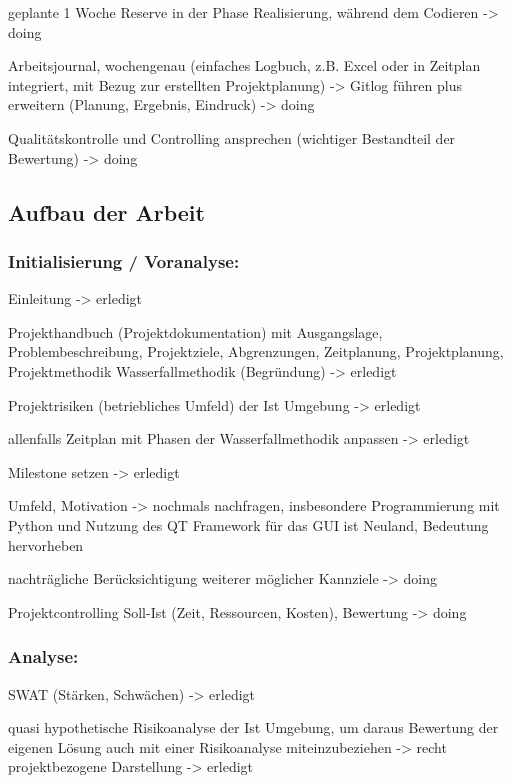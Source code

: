 \documentclass[a4paper,11pt]{article}
\begin{document}
geplante 1 Woche Reserve in der Phase Realisierung, während dem Codieren ->
doing

Arbeitsjournal, wochengenau (einfaches Logbuch, z.B. Excel oder in Zeitplan
integriert, mit Bezug zur erstellten Projektplanung) -> Gitlog führen plus
erweitern (Planung, Ergebnis, Eindruck) -> doing

Qualitätskontrolle und Controlling ansprechen (wichtiger Bestandteil der
Bewertung) -> doing

\subsection*{Aufbau der Arbeit}
\label{sec:org9c6b87a}

\subsubsection*{Initialisierung / Voranalyse:}
\label{sec:org50b579a}

Einleitung -> erledigt

Projekthandbuch (Projektdokumentation) mit Ausgangslage,
Problembeschreibung, Projektziele, Abgrenzungen, Zeitplanung,
Projektplanung, Projektmethodik Wasserfallmethodik (Begründung) -> erledigt

Projektrisiken (betriebliches Umfeld) der Ist Umgebung -> erledigt

allenfalls Zeitplan mit Phasen der Wasserfallmethodik anpassen -> erledigt

Milestone setzen -> erledigt

Umfeld, Motivation -> nochmals nachfragen, insbesondere Programmierung mit
Python und Nutzung des QT Framework für das GUI ist Neuland, Bedeutung
hervorheben

nachträgliche Berücksichtigung weiterer möglicher Kannziele -> doing

Projektcontrolling Soll-Ist (Zeit, Ressourcen, Kosten), Bewertung -> doing

\subsubsection*{Analyse:}
\label{sec:orgeb0951a}

SWAT (Stärken, Schwächen) -> erledigt

quasi hypothetische Risikoanalyse der Ist Umgebung, um daraus Bewertung der
eigenen Lösung auch mit einer Risikoanalyse miteinzubeziehen -> recht
projektbezogene Darstellung -> erledigt
\end{document}
